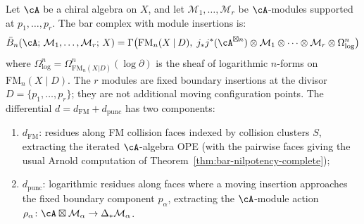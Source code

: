 \begin{theorem}
\label{thm:bar-punctured-curve}
Let $\cA$ be a chiral algebra on $X$, and let
$\mathcal{M}_1, \ldots, \mathcal{M}_r$ be $\cA$-modules
supported at $p_1, \ldots, p_r$. The bar complex with module
insertions is:
\begin{equation}\label{eq:bar-punctured}
\bar{B}_n(\cA;\, \mathcal{M}_1, \ldots, \mathcal{M}_r;\, X)
= \Gamma\bigl(\mathrm{FM}_{n}(X \mathbin{|} D),\;
 j_* j^*(\cA^{\boxtimes n})
 \otimes \mathcal{M}_1 \otimes \cdots \otimes \mathcal{M}_r
 \otimes \Omega^n_{\log}\bigr)
\end{equation}
where $\Omega^n_{\log} = \Omega^n_{\mathrm{FM}_{n}(X|D)}
(\log \partial)$ is the sheaf of logarithmic $n$-forms
on $\mathrm{FM}_{n}(X \mathbin{|} D)$. The $r$ modules are fixed
boundary insertions at the divisor $D=\{p_1,\ldots,p_r\}$; they are not
additional moving configuration points.
The differential
$d = d_{\mathrm{FM}} + d_{\mathrm{punc}}$
has two components:
\begin{enumerate}[label=\textup{(\alph*)}]
\item $d_{\mathrm{FM}}$: residues along FM collision faces indexed by
 collision clusters $S$, extracting the iterated $\cA$-algebra OPE
 \textup{(}with the pairwise faces giving the usual Arnold
 computation of Theorem~\textup{\ref{thm:bar-nilpotency-complete})};
\item $d_{\mathrm{punc}}$: logarithmic residues along faces where a
 moving insertion approaches the fixed boundary component
 $p_\alpha$, extracting the
 $\cA$-module action $\rho_\alpha\colon \cA \boxtimes
 \mathcal{M}_\alpha \to \Delta_* \mathcal{M}_\alpha$.
\end{enumerate}
\end{theorem}

